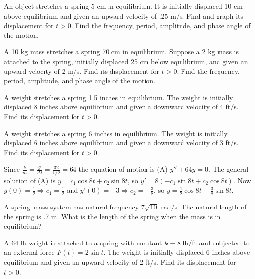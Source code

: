 \documentclass{ximera}
\begin{document}
\begin{problem}\label{exer:6.1.5}
An object stretches a spring 5 cm in equilibrium. It is initially
displaced 10 cm above equilibrium and given an upward velocity of .25
m/s. Find and graph its displacement for $t>0$. Find the frequency,
period, amplitude, and phase angle of the motion.
\end{problem}

\begin{problem}\label{exer:6.1.6}
A 10 kg mass stretches a spring 70 cm in equilibrium. Suppose a 2
kg mass is
attached to the spring, initially displaced 25 cm below equilibrium,
and given an upward velocity of 2 m/s. Find its displacement for
$t>0$. Find the frequency, period, amplitude, and phase angle of the
motion.
\end{problem}

\begin{problem}\label{exer:6.1.7}
A  weight stretches a spring 1.5 inches in equilibrium. The weight
is initially displaced 8 inches above equilibrium and given a downward
velocity of 4 ft/s. Find its displacement for $t > 0$.
\end{problem}

\begin{problem}\label{exer:6.1.8}
A weight stretches a spring 6 inches in equilibrium. The weight is
initially displaced 6 inches above equilibrium and given a downward
velocity of 3 ft/s. Find its displacement for $t>0$.

\begin{solution}
Since $\frac{k}{m}=\frac{g}{\Delta l}=\frac{32}{1/2}=64$ the
equation of motion is (A) $y''+64y=0$. The general solution of (A) is
$y=c_1\cos8t+c_2\sin8t$, so $y'=8(-c_1\sin8t+c_2\cos8t)$. Now
$y(0)=\frac{1}{2}\Rightarrow c_1=\frac{1}{2}$ and
$y'(0)=-3\Rightarrow c_2=-\frac{3}{8}$, so
$y=\frac{1}{2}\cos8t-\frac{3}{8}\sin 8t$.
\end{solution}
\end{problem}

\begin{problem}\label{exer:6.1.9}
A spring--mass system has natural frequency $7\sqrt{10}$ rad/s. The
natural length of the spring is .7 m. What is the length of the spring
when the mass is in equilibrium?
\end{problem}

\begin{problem}\label{exer:6.1.10}
A 64 lb weight is attached to a spring with constant $k=8$ lb/ft and
subjected to an external force $F(t)=2\sin t$. The weight is initially
displaced 6 inches above equilibrium and given an upward velocity of 2
ft/s. Find its displacement for $t>0$.
\end{problem}
\end{document}
